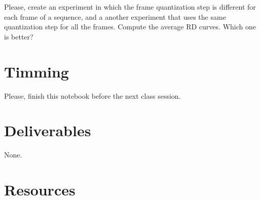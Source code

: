 Please, create an experiment in which the frame quantization step is
different for each frame of a sequence, and a another experiment that
uses the same quantization step for all the frames. Compute the
average RD curves. Which one is better?


\section{Timming}

Please, finish this notebook before the next class session.

\section{Deliverables}

None.

\section{Resources}


